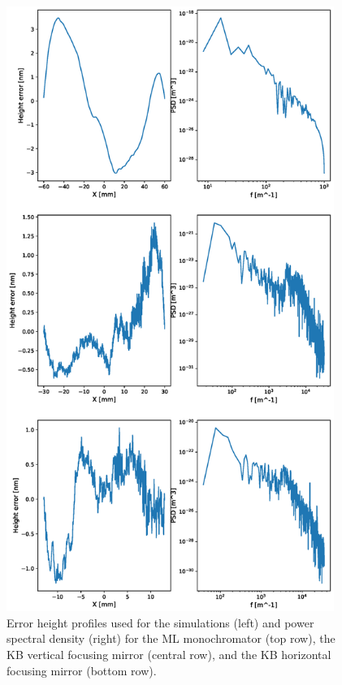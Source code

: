 \documentclass{iucr}              %
\newcommand{\todo}[1]{{\color{red}[TODO: "#1'']}}
\begin{document}
\begin{figure}\label{fig:metrology}
\includegraphics[width=0.95\textwidth]{GRAPHICS/metrology.eps}
\caption{Error height profiles used for the simulations (left) and power spectral density (right) for the ML monochromator (top row), the KB vertical focusing mirror (central row), and the KB horizontal focusing mirror (bottom row).}
\end{figure}





\end{document}
